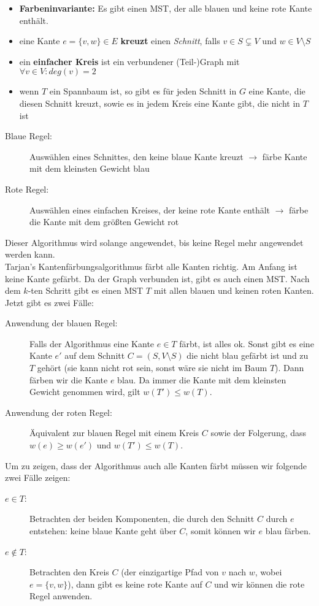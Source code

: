 \begin{itemize}
	\item \textbf{Farbeninvariante:} Es gibt einen MST, der alle blauen und keine rote Kante enthält.
	\item eine Kante $e=\{v,w\}\in E$ \textbf{kreuzt} einen \emph{Schnitt}, falls $v \in S \subsetneq V$ und $w \in V \setminus S$
	\item ein \textbf{einfacher Kreis} ist ein verbundener (Teil-)Graph mit $\forall v \in V : deg(v)=2$
	\item wenn $T$ ein Spannbaum ist, so gibt es für jeden Schnitt in $G$ eine Kante, die diesen Schnitt kreuzt, sowie es in jedem Kreis eine Kante gibt, die nicht in $T$ ist
\end{itemize}
\begin{description}
	\item[Blaue Regel:] Auswählen eines Schnittes, den keine blaue Kante kreuzt $\rightarrow$ färbe Kante mit dem kleinsten Gewicht blau
	\item[Rote Regel:] Auswählen eines einfachen Kreises, der keine rote Kante enthält $\rightarrow$ färbe die Kante mit dem größten Gewicht rot
\end{description}
Dieser Algorithmus wird solange angewendet, bis keine Regel mehr angewendet werden kann.
\topbreak
\up\ \\Tarjan's Kantenfärbungsalgorithmus färbt alle Kanten richtig.
\up\Proof
Am Anfang ist keine Kante gefärbt. Da der Graph verbunden ist, gibt es auch einen MST. Nach dem $k$-ten Schritt gibt es einen MST $T$ mit allen blauen und keinen roten Kanten. Jetzt gibt es zwei Fälle:
\begin{description}
	\item[Anwendung der blauen Regel:] Falls der Algorithmus eine Kante $e \in T$ färbt, ist alles ok. Sonst gibt es eine Kante $e'$ auf dem Schnitt $C=(S,V\setminus S)$ die nicht blau gefärbt ist und zu $T$ gehört (sie kann nicht rot sein, sonst wäre sie nicht im Baum $T$). Dann färben wir die Kante $e$ blau. Da immer die Kante mit dem kleinsten Gewicht genommen wird, gilt $w(T')\leq w(T)$.
	\item[Anwendung der roten Regel:] Äquivalent zur blauen Regel mit einem Kreis $C$ sowie der Folgerung, dass $w(e) \geq w(e')$ und $w(T')\leq w(T)$.
\end{description}
Um zu zeigen, dass der Algorithmus auch alle Kanten färbt müssen wir folgende zwei Fälle zeigen:
\begin{description}
	\item[$e \in T$:] Betrachten der beiden Komponenten, die durch den Schnitt $C$ durch $e$ entstehen: keine blaue Kante geht über $C$, somit können wir $e$ blau färben.
	\item[$e \notin T$:] Betrachten den Kreis $C$ (der einzigartige Pfad von $v$ nach $w$, wobei $e=\{v,w\}$), dann gibt es keine rote Kante auf $C$ und wir können die rote Regel anwenden.
\end{description}\ \\